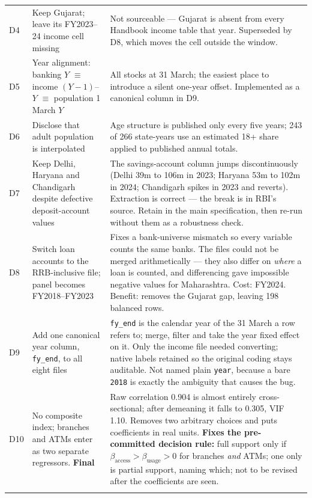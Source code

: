 {\begin{longtable}{@{}p{0.7cm}p{3.1cm}p{10.5cm}@{}}
D4 & Keep Gujarat; leave its FY2023--24 income cell missing &
Not sourceable --- Gujarat is absent from every Handbook income table that year. Superseded by D8, which moves the cell outside the window. \\
\addlinespace

D5 & Year alignment: banking $Y$ $\equiv$ income $(Y{-}1)$--$Y$ $\equiv$ population 1 March $Y$ &
All stocks at 31 March; the easiest place to introduce a silent one-year offset. Implemented as a canonical column in D9. \\
\addlinespace

D6 & Disclose that adult population is interpolated &
Age structure is published only every five years; 243 of 266 state-years use an estimated 18+ share applied to published annual totals. \\
\addlinespace

D7 & Keep Delhi, Haryana and Chandigarh despite defective deposit-account values &
The savings-account column jumps discontinuously (Delhi 39m to 106m in 2023; Haryana 53m to 102m in 2024; Chandigarh spikes in 2023 and reverts). Extraction is correct --- the break is in RBI's source. Retain in the main specification, then re-run without them as a robustness check. \\
\addlinespace

D8 & Switch loan accounts to the RRB-inclusive file; panel becomes FY2018--FY2023 &
Fixes a bank-universe mismatch so every variable counts the same banks. The files could not be merged arithmetically --- they also differ on \emph{where} a loan is counted, and differencing gave impossible negative values for Maharashtra. Cost: FY2024. Benefit: removes the Gujarat gap, leaving 198 balanced rows. \\
\addlinespace

D9 & Add one canonical year column, \texttt{fy\_end}, to all eight files &
\texttt{fy\_end} is the calendar year of the 31 March a row refers to; merge, filter and take the year fixed effect on it. Only the income file needed converting; native labels retained so the original coding stays auditable. Not named plain \texttt{year}, because a bare \texttt{2018} is exactly the ambiguity that causes the bug. \\
\addlinespace

D10 & No composite index; branches and ATMs enter as two separate regressors. \textbf{Final} &
Raw correlation 0.904 is almost entirely cross-sectional; after demeaning it falls to 0.305, VIF 1.10. Removes two arbitrary choices and puts coefficients in real units. \textbf{Fixes the pre-committed decision rule:}
full support only if $\beta_{\text{access}} > \beta_{\text{usage}} > 0$ for branches \emph{and}
ATMs; one only is partial support, naming which; not to be revised after the coefficients are
seen. \\
\addlinespace


\end{longtable}}
